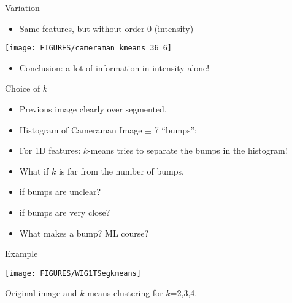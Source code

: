 \documentclass[9pt]{beamer}
\begin{document}
\begin{frame}[t]{Variation}
  \begin{itemize}
  \item Same features, but without order 0 (intensity)
  \end{itemize}
  \begin{center}
    \texttt{[image: FIGURES/cameraman\_kmeans\_36\_6]}
  \end{center}
  \begin{itemize}
  \item Conclusion: a lot of information in intensity alone!
  \end{itemize}
  \pause
  \begin{center}
  \end{center}

\end{frame}


\begin{frame}[t]{Choice of $k$}
  \begin{itemize}
    \item Previous image clearly over segmented.
  \item Histogram of Cameraman Image $\pm$ 7 ``bumps'':
    \begin{center}
    \end{center}
  \item For 1D features: $k$-means tries to separate the bumps in the histogram!
  \item What if $k$ is far from the number of bumps,
  \item if bumps are unclear?
  \item if bumps are very close?
  \item What makes a bump? ML course?
    \pause
\end{itemize}
\end{frame}


\begin{frame}{Example}
  \begin{center}
    \texttt{[image: FIGURES/WIG1TSegkmeans]}
  \end{center}
  Original image and $k$-means clustering for $k$=2,3,4. 
\end{frame}
\end{document}
